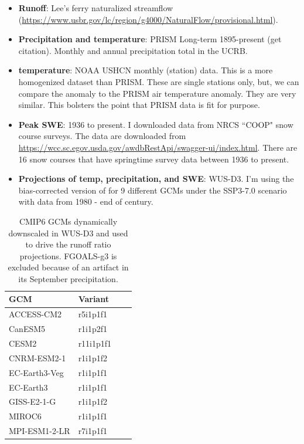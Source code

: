 \documentclass[draft]{agujournal2019}
\begin{document}
\begin{itemize}
\item \textbf{Runoff}: Lee's ferry naturalized streamflow  (\url{https://www.usbr.gov/lc/region/g4000/NaturalFlow/provisional.html}). 
\item \textbf{Precipitation and temperature}: PRISM Long-term 1895-present (get citation). Monthly and annual precipitation total in the UCRB.
\item \textbf{temperature}: NOAA USHCN monthly (station) data. This is a more homogenized dataset than PRISM. These are single stations only, but, we can compare the anomaly to the PRISM air temperature anomaly. They are very similar. This bolsters the point that PRISM data is fit for purpose.
\item \textbf{Peak SWE}: 1936 to present. I downloaded data from NRCS ``COOP" snow course surveys. The data are downloaded from \url{https://wcc.sc.egov.usda.gov/awdbRestApi/swagger-ui/index.html}. There are 16 snow courses that have springtime survey data between 1936 to present.
\item \textbf{Projections of temp, precipitation, and SWE}: WUS-D3. I'm using the bias-corrected version of \cite{Rahimi2024-gl} for 9 different GCMs under the SSP3-7.0 scenario with data from 1980 - end of century.
\end{itemize}


\begin{table}
\caption{CMIP6 GCMs dynamically downscaled in WUS-D3 \cite{Rahimi2024-gl} and used to drive the runoff ratio projections. FGOALS-g3 is excluded because of an artifact in its September precipitation.}
\centering
\begin{tabular}{l l l l}
\hline
GCM & Variant  \\
\hline
ACCESS-CM2    & r5i1p1f1  \\
CanESM5       & r1i1p2f1  \\
CESM2         & r11i1p1f1 \\
CNRM-ESM2-1   & r1i1p1f2  \\
EC-Earth3-Veg & r1i1p1f1  \\
EC-Earth3     & r1i1p1f1  \\
GISS-E2-1-G   & r1i1p1f2  \\
MIROC6        & r1i1p1f1  \\
MPI-ESM1-2-LR & r7i1p1f1  \\
\hline
\end{tabular}
\label{tab:gcms}
\end{table}





\end{document}
